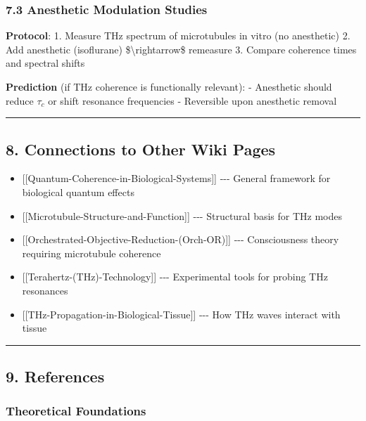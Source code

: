 \subsubsection{7.3 Anesthetic Modulation
Studies}\label{anesthetic-modulation-studies}

\textbf{Protocol}: 1. Measure THz spectrum of microtubules in vitro (no
anesthetic) 2. Add anesthetic (isoflurane) \$\textbackslash rightarrow\$
remeasure 3. Compare coherence times and spectral shifts

\textbf{Prediction} (if THz coherence is functionally relevant): -
Anesthetic should reduce \(\tau_c\) or shift resonance frequencies -
Reversible upon anesthetic removal

\begin{center}\rule{0.5\linewidth}{0.5pt}\end{center}

\subsection{8. Connections to Other Wiki
Pages}\label{connections-to-other-wiki-pages}

\begin{itemize}
\tightlist
\item
  {[}{[}Quantum-Coherence-in-Biological-Systems{]}{]} -\/-\/- General
  framework for biological quantum effects
\item
  {[}{[}Microtubule-Structure-and-Function{]}{]} -\/-\/- Structural
  basis for THz modes
\item
  {[}{[}Orchestrated-Objective-Reduction-(Orch-OR){]}{]} -\/-\/-
  Consciousness theory requiring microtubule coherence
\item
  {[}{[}Terahertz-(THz)-Technology{]}{]} -\/-\/- Experimental tools for
  probing THz resonances
\item
  {[}{[}THz-Propagation-in-Biological-Tissue{]}{]} -\/-\/- How THz waves
  interact with tissue
\end{itemize}

\begin{center}\rule{0.5\linewidth}{0.5pt}\end{center}

\subsection{9. References}\label{references}

\subsubsection{Theoretical Foundations}\label{theoretical-foundations}

